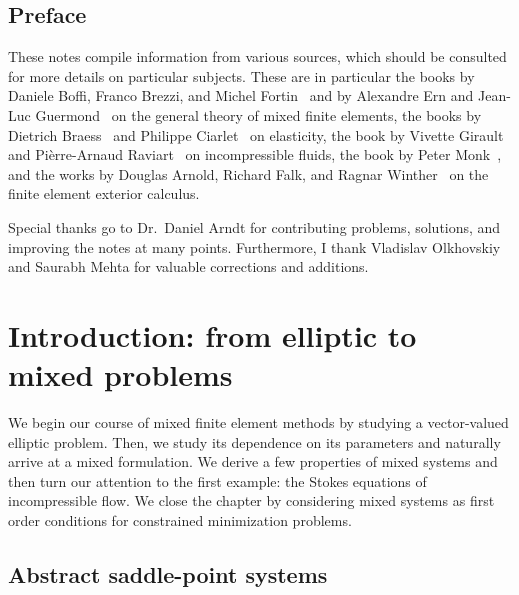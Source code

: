 
\maketitle

\section*{Preface}
%

These notes compile information from various sources, which should be
consulted for more details on particular subjects. These are in
particular the books by Daniele Boffi, Franco Brezzi, and Michel
Fortin~\cite{BoffiBrezziFortin13} and by Alexandre Ern and Jean-Luc
Guermond~\cite{ErnGuermond04} on the general theory of mixed finite
elements, the books by Dietrich Braess~\cite{Braess97,Braess13} and
Philippe Ciarlet~\cite{Ciarlet88} on elasticity, the book by Vivette
Girault and Pièrre-Arnaud Raviart~\cite{GiraultRaviart86} on
incompressible fluids, the book by Peter Monk~\cite{Monk03}, and the
works by Douglas Arnold, Richard Falk, and Ragnar
Winther~\cite{ArnoldFalkWinther06acta,ArnoldFalkWinther10} on the
finite element exterior calculus.

Special thanks go to Dr.~Daniel Arndt for contributing problems,
solutions, and improving the notes at many points. Furthermore, I
thank Vladislav Olkhovskiy and Saurabh Mehta for valuable corrections
and additions.
\thispagestyle{empty}
\setcounter{page}{0}


\tableofcontents

\chapter{Introduction: from elliptic to mixed problems}
We begin our course of mixed finite element methods by studying a
vector-valued elliptic problem. Then, we study its dependence on its
parameters and naturally arrive at a mixed formulation. We derive a
few properties of mixed systems and then turn our attention to the
first example: the Stokes equations of incompressible flow. We close
the chapter by considering mixed systems as first order conditions
for constrained minimization problems.



\section{Abstract saddle-point systems}


